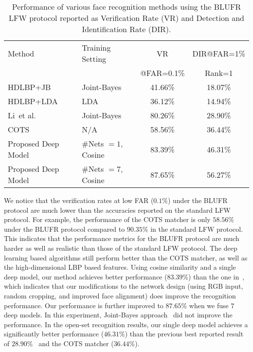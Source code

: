 \documentclass[10pt,journal,compsoc]{IEEEtran}
\newcommand{\etal}{et al.}
\begin{document}
\begin{table}[htbp]
\scriptsize
\centering
\caption{
Performance of various face recognition methods using the BLUFR LFW protocol reported as Verification Rate (VR) and Detection and Identification Rate (DIR).}\label{tab:lfw_blufr}
\begin{tabular}{l|l|c|c}
\toprule
\multirow{1}{*}{Method}          & \multirow{1}{*}{Training Setting}  & VR          & DIR@FAR=1\%   \\
                                 &                                    & @FAR=0.1\%  & Rank=1        \\
\midrule
HDLBP+JB~\cite{BLUFR}            & Joint-Bayes                        & 41.66\% & 18.07\% \\
HDLBP+LDA~\cite{BLUFR}           & LDA                                & 36.12\% & 14.94\% \\
Li~\etal~\cite{DB:CASIA}         & Joint-Bayes                        & 80.26\% & 28.90\% \\
COTS                             & N/A                                & 58.56\% & 36.44\% \\ \hline
Proposed Deep Model              & \#Nets $=1$, Cosine                    & 83.39\% & 46.31\% \\
Proposed Deep Model              & \#Nets $=7$, Cosine                    & 87.65\% & 56.27\% \\
\bottomrule
\end{tabular}
\end{table}

We notice that the verification rates at low FAR ($0.1\%$) under the BLUFR protocol are much lower than the accuracies reported on the standard LFW protocol. For example, the performance of the COTS matcher is only $58.56\%$ under the BLUFR protocol compared to $90.35\%$ in the standard LFW protocol. This indicates that the performance metrics for the BLUFR protocol are much harder as well as realistic than those of the standard LFW protocol. The deep learning based algorithms still perform better than the COTS matcher, as well as the high-dimensional LBP based features. Using cosine similarity and a single deep model, our method achieves better performance ($83.39\%$) than the one in~\cite{DB:CASIA}, which indicates that our modifications to the network design (using RGB input, random cropping, and improved face alignment) does improve the recognition performance. Our performance is further improved to $87.65\%$ when we fuse $7$ deep models. In this experiment, Joint-Bayes approach~\cite{ml:jointbayes} did not improve the performance. In the open-set recognition results, our single deep model achieves a significantly better performance ($46.31\%$) than the previous best reported result of $28.90\%$~\cite{DB:CASIA} and the COTS matcher ($36.44\%$).
\end{document}
